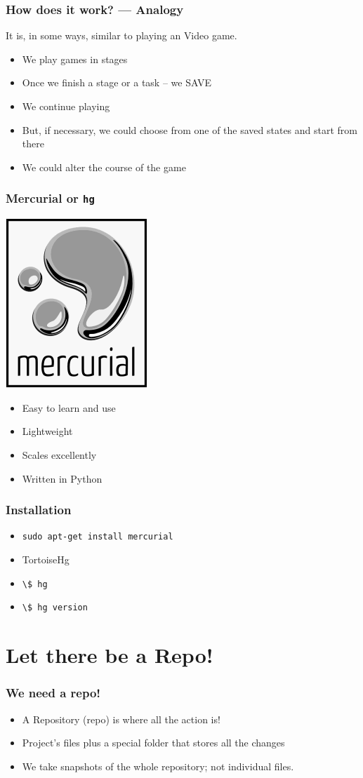 \documentclass[14pt,compress]{beamer}
\newcommand{\typ}[1]{\lstinline{#1}}
\begin{document}
\begin{frame}[fragile]
  \frametitle{How does it work? --- Analogy}
  It is, in some ways, similar to playing an Video game.
  \begin{itemize}
  \item We play games in stages
  \item Once we finish a stage or a task -- \alert{we SAVE}
  \item We continue playing
  \item But, if necessary, we could choose from one of the saved
    states and start from there
  \item We could alter the course of the game
  \end{itemize}
\end{frame}


\begin{frame}
  \frametitle{Mercurial or \typ{hg}}
  \begin{center}
    \includegraphics[height=.75in,interpolate=true]{images/mercurial_logo}
  \end{center}
  \begin{itemize}
  \item Easy to learn and use
  \item Lightweight
  \item Scales excellently
  \item Written in Python
  \end{itemize}
\end{frame}

\begin{frame}
  \frametitle{Installation}
  \begin{itemize}
  \item \typ{sudo apt-get install mercurial}
  \item TortoiseHg
  \item \typ{\$ hg}
  \item \typ{\$ hg version}
  \end{itemize}
\end{frame}

\section{Let there be a Repo!}
\begin{frame}
  \frametitle{We need a repo!}
  \begin{itemize}
  \item A Repository (repo) is where all the action is!
  \item Project's files plus a special folder that stores all the
    changes
  \item We take snapshots of the whole repository; not individual
    files. 
  \end{itemize}
\end{frame}
\end{document}
